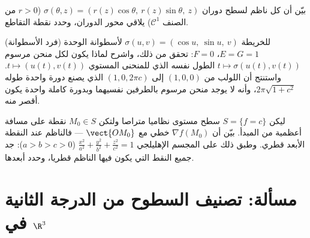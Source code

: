 \begin{exercise}[$\star\star$]\label{exo:b2:surfaces:10}
بيّن أن كل ناظم لسطح دوران $\sigma(\theta, z) = (r(z)\cos\theta,\ r(z)\sin\theta,\ z)$ ($r > 0$ من الصنف $\mathcal C^1$) يلاقي
محور الدوران، وحدد نقطة التقاطع.
\end{exercise}

\begin{exercise}[$\star\star$]\label{exo:b2:surfaces:11}
(فرد الأسطوانة) للخريطة $\sigma(u, v) = (\cos u,\
\sin u,\ v)$ لأسطوانة الوحدة $E = G = 1$، $F = 0$:
تحقق من ذلك، واشرح لماذا يكون لكل منحن مرسوم $t \mapsto
\sigma(u(t), v(t))$ الطول نفسه الذي
للمنحنى المستوي $t
\mapsto (u(t), v(t))$. واستنتج أن اللولب من $(1, 0, 0)$ إلى $(1, 0, 2\pi c)$
الذي يصنع دورة واحدة طوله $2\pi\sqrt{1 + c^2}$، وأنه لا يوجد منحن مرسوم بالطرفين
نفسيهما وبدورة كاملة واحدة يكون أقصر منه.
\end{exercise}

\begin{exercise}[$\star\star\star$]\label{exo:b2:surfaces:12}
ليكن $S = \{f = c\}$ سطح مستوى نظاميا متراصا ولتكن $M_0 \in S$ نقطة على مسافة
أعظمية من المبدأ. بيّن أن $\nabla f(M_0)$ خطي مع $\vect{OM_0}$ --- فالناظم عند
النقطة الأبعد قطري. وطبق ذلك على المجسم الإهليلجي $\frac{x^2}{a^2} + \frac{y^2}{b^2} + \frac{z^2}{c^2} = 1$ ($a >
b > c > 0$):
جد جميع النقط التي يكون فيها الناظم قطريا، وحدد أبعدها.
\end{exercise}

\section{مسألة: تصنيف السطوح من الدرجة الثانية في $\R^3$}

